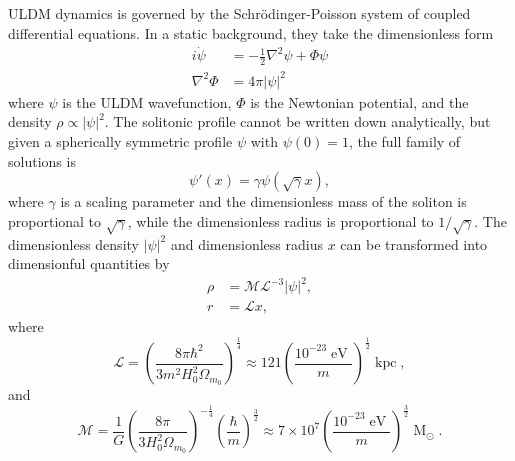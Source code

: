 \documentclass[a4paper,11pt]{article}
\begin{document}
ULDM dynamics is governed by the Schr{\"o}dinger-Poisson system of coupled differential equations. In a static background, they take the dimensionless form  
%
\begin{align}
    i\dot{\psi} &= -\frac{1}{2}\nabla^2\psi+\Phi\psi \\
    \nabla^2\Phi &= 4\pi \vert \psi\vert^2
\end{align}
%
where $\psi$ is the ULDM wavefunction, $\Phi$ is the Newtonian potential, and the density $\rho \propto |\psi|^2$. The solitonic profile cannot be written down analytically, but given a spherically symmetric  profile $\psi$ with $\psi(0)=1$, the full family of solutions is
%
\begin{equation}
    \psi'(x) = \gamma\psi(\sqrt{\gamma}x),
\end{equation}
%
where $\gamma$ is a scaling parameter and the dimensionless mass of the soliton is proportional to $\sqrt{\gamma}$, while the dimensionless radius is proportional to $1/\sqrt{\gamma}$. The dimensionless density $\vert\psi\vert^2$ and dimensionless radius $x$ can be transformed into dimensionful quantities by
\begin{align}
    \rho &= \mathcal{M}\mathcal{L}^{-3}\vert\psi\vert^2, \label{eq:density_conv} \\
    r &= \mathcal{L}x, \label{eq:mass_conv}
\end{align}
where
\begin{equation}\label{eq:length}
    \mathcal{L}=\left(\frac{8\pi\hbar^2}{3 m^2H_0^2\Omega_{m_0}}\right)^{\frac{1}{4}}\approx121\left(\frac{10^{-23}\operatorname{eV}}{m}\right)^{\frac{1}{2}}\operatorname{kpc},
\end{equation}
%
and 
%
\begin{equation}\label{eq:mass}
    \mathcal{M}=\frac{1}{G}\left(\frac{8\pi}{3 H_0^2\Omega_{m_0}}\right)^{-\frac{1}{4}}\left(\frac{\hbar}{m}\right)^{\frac{3}{2}}\approx 7\times 10^7\left(\frac{10^{-23}\operatorname{eV}}{m}\right)^{\frac{3}{2}}\operatorname{M}_{\odot}.
\end{equation}

\
\end{document}
